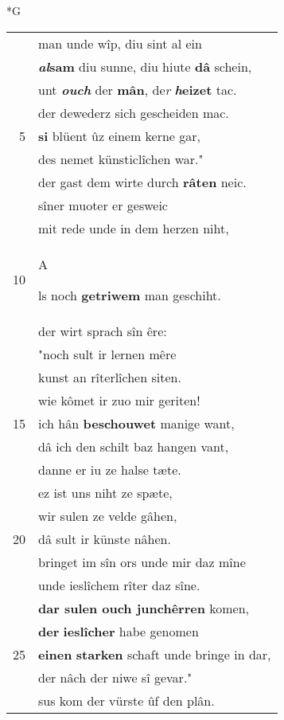 \documentclass[8pt,a4paper,notitlepage]{article}
\begin{document}
\newpage
\begin{table}[ht]
\begin{minipage}[t]{0.5\linewidth}
\small
\begin{center}*G
\end{center}
\begin{tabular}{rl}
 & man unde wîp, diu sint al ein\\ 
 & \textbf{\textit{al}sam} diu sunne, diu hiute \textbf{dâ} schein,\\ 
 & unt \textit{\textbf{ouch}} der \textbf{mân}, de\textit{r} \textbf{\textit{h}eizet} tac.\\ 
 & der dewederz sich gescheiden mac.\\ 
5 & \textbf{si} blüent ûz einem kerne gar,\\ 
 & des nemet künsticlîchen war."\\ 
 & der gast dem wirte durch \textbf{râten} neic.\\ 
 & sîner muoter er gesweic\\ 
 & mit rede unde in dem herzen niht,\\ 
10 & \begin{large}A\end{large}ls noch \textbf{getriwem} man geschiht.\\ 
 & der wirt sprach sîn êre:\\ 
 & "noch sult ir lernen mêre\\ 
 & kunst an rîterlîchen siten.\\ 
 & wie kômet ir zuo mir geriten!\\ 
15 & ich hân \textbf{beschouwet} manige want,\\ 
 & dâ ich den schilt baz hangen vant,\\ 
 & danne er iu ze halse tæte.\\ 
 & ez ist uns niht ze spæte,\\ 
 & wir sulen ze velde gâhen,\\ 
20 & dâ sult ir künste nâhen.\\ 
 & bringet im sîn ors unde mir daz mîne\\ 
 & unde ieslîchem rîter daz sîne.\\ 
 & \textbf{dar sulen ouch junchêrren} komen,\\ 
 & \textbf{der} \textbf{ieslîcher} habe genomen\\ 
25 & \textbf{einen} \textbf{starken} schaft unde bringe in dar,\\ 
 & der nâch der niwe sî gevar."\\ 
 & sus kom der vürste ûf den plân.\\ 

\end{tabular}
\end{minipage}
\end{table}
\end{document}
